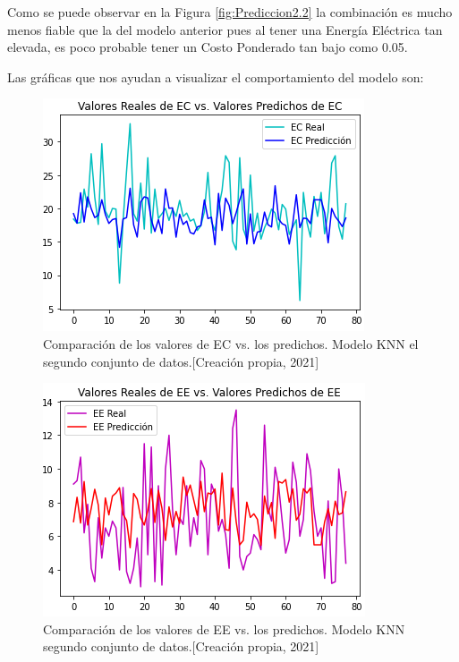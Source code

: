 \documentclass{article}
\begin{document}
Como se puede observar en la Figura \ref{fig:Prediccion2.2} la combinación es mucho menos fiable que la del modelo anterior pues al tener una Energía Eléctrica tan elevada, es poco probable tener un Costo Ponderado tan bajo como 0.05.
\pagebreak

Las gráficas que nos ayudan a visualizar el comportamiento del modelo son:
\begin{figure}[!h]
    \centering
    \includegraphics[scale=.7]{F4/F4-im15.PNG}
    \caption{Comparación de los valores de EC vs. los predichos. Modelo  KNN el segundo conjunto de datos.[Creación propia, 2021]}
    \label{fig:EC2.1}
\end{figure}

\begin{figure}[!h]
    \centering
    \includegraphics[scale=.7]{F4/F4-im16.PNG}
    \caption{Comparación de los valores de EE vs. los predichos. Modelo KNN segundo conjunto de datos.[Creación propia, 2021]}
    \label{fig:EE2.1}
\end{figure}
\end{document}
